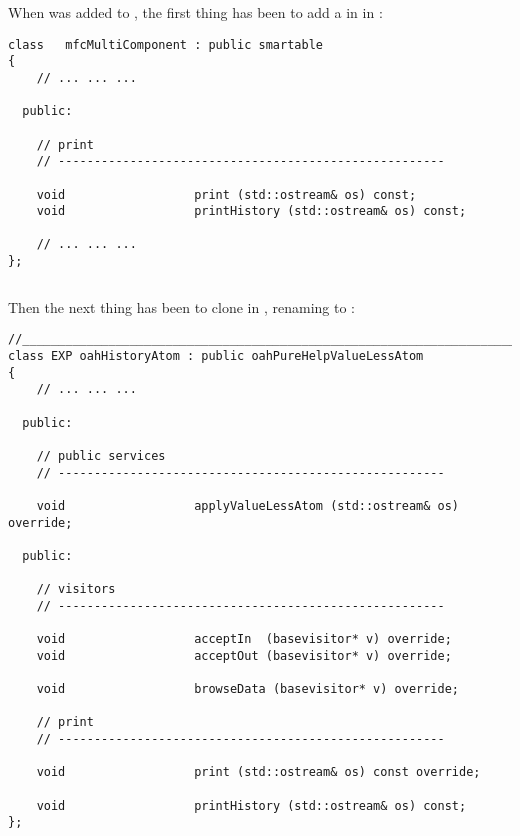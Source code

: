 When  was added to \oahRepr, the first thing has been to add a  in  in :
\begin{lstlisting}[language=CPlusPlus]
class   mfcMultiComponent : public smartable
{
	// ... ... ...

  public:

    // print
    // ------------------------------------------------------

    void                  print (std::ostream& os) const;
    void                  printHistory (std::ostream& os) const;

	// ... ... ...
};
\end{lstlisting}

\begin{lstlisting}[language=CPlusPlus]

\end{lstlisting}

Then the next thing has been to clone  in , renaming  to :
\begin{lstlisting}[language=CPlusPlus]
//______________________________________________________________________________
class EXP oahHistoryAtom : public oahPureHelpValueLessAtom
{
	// ... ... ...

  public:

    // public services
    // ------------------------------------------------------

    void                  applyValueLessAtom (std::ostream& os) override;

  public:

    // visitors
    // ------------------------------------------------------

    void                  acceptIn  (basevisitor* v) override;
    void                  acceptOut (basevisitor* v) override;

    void                  browseData (basevisitor* v) override;

    // print
    // ------------------------------------------------------

    void                  print (std::ostream& os) const override;

    void                  printHistory (std::ostream& os) const;
};
\end{lstlisting}

